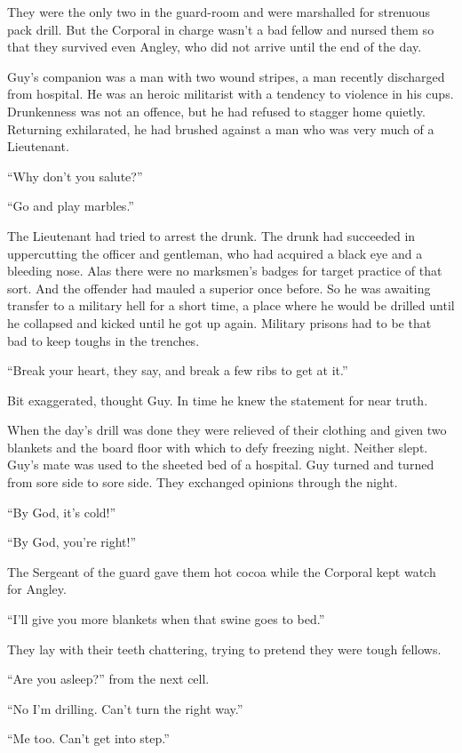They were the only two in the guard-room and were marshalled 
for strenuous pack drill. But the Corporal in charge wasn't a 
bad fellow and nursed them so that they survived even Angley, 
who did not arrive until the end of the day.

Guy's companion was a man with two wound stripes, a man recently 
discharged from hospital. He was an heroic militarist with a 
tendency to violence in his cups. Drunkenness was not an offence, 
but he had refused to stagger home quietly. Returning exhilarated, 
he had brushed against a man who was very much of a Lieutenant.

``Why don't you salute?''

``Go and play marbles.''

The Lieutenant had tried to arrest the drunk. The drunk had succeeded 
in uppercutting the officer and gentleman, who had acquired a black eye 
and a bleeding nose. Alas there were no marksmen's badges for target 
practice of that sort. And the offender had mauled a superior once 
before. So he was awaiting transfer to a military hell for a short time, 
a place where he would be drilled until he collapsed and kicked until 
he got up again. Military prisons had to be that bad to keep toughs 
in the trenches.

``Break your heart, they say, and break a few ribs to get at it.''

Bit exaggerated, thought Guy. In time he knew the statement for near truth.

When the day's drill was done they were relieved of their clothing and 
given two blankets and the board floor with which to defy freezing night. 
Neither slept. Guy's mate was used to the sheeted bed of a hospital. Guy 
turned and turned from sore side to sore side. They exchanged opinions 
through the night.

``By God, it's cold!''

``By God, you're right!''

The Sergeant of the guard gave them hot cocoa while the Corporal kept 
watch for Angley.

``I'll give you more blankets when that swine goes to bed.''

They lay with their teeth chattering, trying to pretend they were 
tough fellows.

``Are you asleep?'' from the next cell.

``No I'm drilling. Can't turn the right way.''

``Me too. Can't get into step.''

